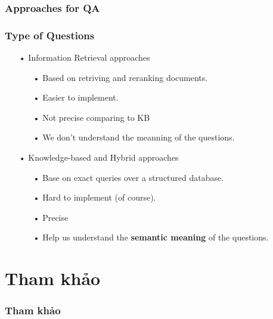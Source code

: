 \documentclass{beamer}
\begin{document}
\begin{frame}
	\frametitle{Approaches for QA}		
	
	\frametitle{Type of Questions}
			
	\begin{itemize}
		\item[•] Information Retrieval approaches
			\begin{itemize}
			    \item[•] Based on retriving and reranking documents.
				\item[•] Easier to implement.
				\item[•] Not precise comparing to KB
				\item[•] We don't understand the meanning of the questions.
			\end{itemize}
		
		\item[•] Knowledge-based and Hybrid approaches
			\begin{itemize}
			\item[•] Base on exact queries over a structured database.
			\item[•] Hard to implement (of course).
			\item[•] Precise
			\item[•] Help us understand the \textbf{semantic meaning} of the questions. 
			\end{itemize}
	\end{itemize}		
		
			
\end{frame}
	
\section{Tham khảo}
\begin{frame}
	\frametitle{Tham khảo}
	\printbibliography
\end{frame}
	
	
	
	
	
	
	
\end{document}
